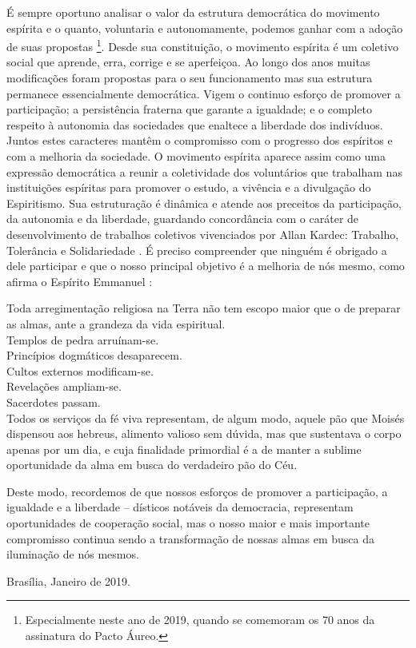 É sempre oportuno analisar o valor da estrutura democrática do movimento espírita e o quanto, voluntaria e autonomamente, podemos ganhar com a adoção de suas propostas \footnote{Especialmente neste ano de 2019, quando se comemoram os 70 anos da assinatura do Pacto Áureo.}. Desde sua constituição, o movimento espírita é um coletivo social que aprende, erra, corrige e se aperfeiçoa. Ao longo dos anos muitas modificações foram propostas para o seu funcionamento mas sua estrutura permanece essencialmente democrática. Vigem o continuo esforço de promover a participação; a persistência fraterna que garante a igualdade; e o completo respeito à autonomia das sociedades que enaltece a liberdade dos indivíduos. Juntos estes caracteres mantêm o compromisso com o progresso dos espíritos e com a melhoria da sociedade. O movimento espírita aparece assim como uma expressão democrática a reunir a coletividade dos voluntários que trabalham nas instituições espíritas para promover o estudo, a vivência e a divulgação do Espiritismo. Sua estruturação é dinâmica e atende aos preceitos da participação, da autonomia e da liberdade, guardando concordância com o caráter de desenvolvimento de trabalhos coletivos vivenciados por Allan Kardec: Trabalho, Tolerância e Solidariedade \cite[p. 14]{Kardec1890}. É preciso compreender que ninguém é obrigado a dele participar e que o nosso principal objetivo é a melhoria de nós mesmo, como afirma o Espírito Emmanuel \cite[Edição Kindle: comentário a João 6:32]{emmEvJoao}:

\begin{citacao}
Toda arregimentação religiosa na Terra não tem escopo maior que o de preparar as almas, ante a grandeza da vida espiritual.\\
Templos de pedra arruínam-se.\\
Princípios dogmáticos desaparecem.\\
Cultos externos modificam-se.\\
Revelações ampliam-se.\\
Sacerdotes passam.\\
Todos os serviços da fé viva representam, de algum modo, aquele pão que Moisés dispensou aos hebreus, alimento valioso sem dúvida, mas que sustentava o corpo apenas por um dia, e cuja finalidade primordial é a de manter a sublime oportunidade da alma em busca do verdadeiro pão do Céu.
\end{citacao}
 
 Deste modo, recordemos de que nossos esforços de promover a participação, a igualdade e a liberdade -- dísticos notáveis da democracia, representam  oportunidades de cooperação social, mas o nosso maior e mais importante compromisso continua sendo a transformação de nossas almas em busca da iluminação de nós mesmos.

\vspace{1,2cm}
\hspace{\fill} Brasília, Janeiro de 2019.